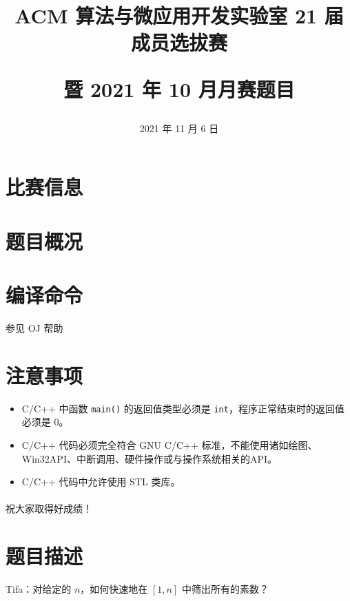 \documentclass{../cpct/ctpro}
\title
{
    ACM 算法与微应用开发实验室 21 届成员选拔赛\par
    暨 2021 年 10 月月赛题目
}
\date{2021 年 11 月 6 日}
\begin{document}
\maketitle
{}

\section*{比赛信息}


\section*{题目概况}

\problemtab

\section*{编译命令}

参见 OJ 帮助

\section*{注意事项}

\begin{itemize}
    \item C/C++ 中函数 \verb|main()| 的返回值类型必须是 \verb|int|，程序正常结束时的返回值必须是 $0$。
    \item C/C++ 代码必须完全符合 GNU C/C++ 标准，不能使用诸如绘图、Win32API、中断调用、硬件操作或与操作系统相关的API。
    \item C/C++ 代码中允许使用 STL 类库。
\end{itemize}

\paragraph*{} 祝大家取得好成绩！

\makeproblem
\section*{题目描述}

Tifa：对给定的 $n$，如何快速地在 $[1,n]$ 中筛出所有的素数？
\end{document}
